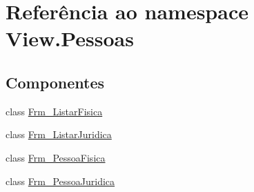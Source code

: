 \hypertarget{namespace_view_1_1_pessoas}{}\section{Referência ao namespace View.\+Pessoas}
\label{namespace_view_1_1_pessoas}
\subsection*{Componentes}
\begin{DoxyCompactItemize}
\item 
class \hyperlink{class_view_1_1_pessoas_1_1_frm___listar_fisica}{Frm\+\_\+\+Listar\+Fisica}
\item 
class \hyperlink{class_view_1_1_pessoas_1_1_frm___listar_juridica}{Frm\+\_\+\+Listar\+Juridica}
\item 
class \hyperlink{class_view_1_1_pessoas_1_1_frm___pessoa_fisica}{Frm\+\_\+\+Pessoa\+Fisica}
\item 
class \hyperlink{class_view_1_1_pessoas_1_1_frm___pessoa_juridica}{Frm\+\_\+\+Pessoa\+Juridica}
\end{DoxyCompactItemize}
